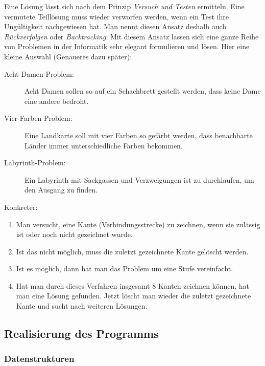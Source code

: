 \documentclass{bschlangaul-aufgabe}
\begin{document}
\begin{bExkurs}[Backtracking]
Eine Lösung lässt sich nach dem Prinzip \emph{Versuch und Testen}
ermitteln. Eine vermutete Teillösung muss wieder verworfen werden, wenn
ein Test ihre Ungültigkeit nachgewiesen hat. Man nennt diesen Ansatz
deshalb auch \emph{Rückverfolgen} oder \emph{Backtracking}. Mit diesem
Ansatz lassen sich eine ganze Reihe von Problemen in der Informatik sehr
elegant formulieren und lösen. Hier eine kleine Auswahl (Genaueres dazu
später):

\begin{description}
\item[Acht-Damen-Problem:] Acht Damen sollen so auf ein Schachbrett
gestellt werden, dass keine Dame eine andere bedroht.

\item[Vier-Farben-Problem:] Eine Landkarte soll mit vier Farben so
gefärbt werden, dass benachbarte Länder immer unterschiedliche Farben
bekommen.

\item[Labyrinth-Problem:] Ein Labyrinth mit Sackgassen und Verzweigungen
ist zu durchlaufen, um den Ausgang zu finden.
\end{description}
\end{bExkurs}

\noindent
Konkreter:

\begin{enumerate}
\item Man versucht, eine Kante (Verbindungsstrecke) zu zeichnen, wenn
sie zulässig ist oder noch nicht gezeichnet wurde.

\item Ist das nicht möglich, muss die zuletzt gezeichnete Kante gelöscht
werden.

\item  Ist es möglich, dann hat man das Problem um eine Stufe
vereinfacht.

\item  Hat man durch dieses Verfahren insgesamt 8 Kanten zeichnen
können, hat man eine Lösung gefunden. Jetzt löscht man wieder die
zuletzt gezeichnete Kante und sucht nach weiteren Lösungen.
\end{enumerate}

\subsection{Realisierung des Programms}

\subsubsection{Datenstrukturen}
\end{document}
